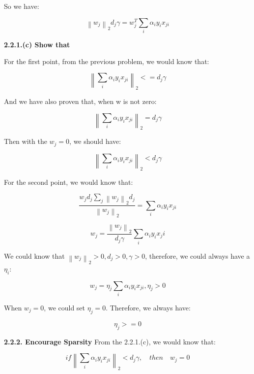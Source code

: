\documentclass{article} %
\newcommand{\norm}[1]{\left\lVert #1 \right\rVert}
\begin{document}
So we have:

\begin{equation}
\norm{w_j}_2 d_j \gamma = w_j^T \sum_i \alpha_i y_i x_{ji}
\end{equation}

\textbf{2.2.1.(c) Show that}

For the first point, from the previous problem, we would know that:

\begin{equation}
\norm{\sum_i \alpha_i y_i x_{ji}}_2 <= d_j \gamma
\end{equation}

And we have also proven that, when w is not zero:

\begin{equation}
\norm{\sum_i \alpha_i y_i x_{ji}}_2 = d_j \gamma
\end{equation}

Then with the $w_j = 0$, we should have:

\begin{equation}
\norm{\sum_i \alpha_i y_i x_{ji}}_2 < d_j \gamma
\end{equation}

For the second point, we would know that:

\begin{equation}
\frac{w_j d_j \sum_j \norm{w_j}_2 d_j }{\norm{w_j}_2} = \sum_i \alpha_i y_i x_{ji}
\end{equation}

\begin{equation}
w_j = \frac{\norm{w_j}_2}{d_j \gamma} \sum_i \alpha_i y_i x_ji
\end{equation}

We could know that $\norm{w_j}_2 > 0, d_j>0, \gamma>0$, therefore, we could
always have a $\eta_i$:

\begin{equation}
w_j = \eta_j \sum_i \alpha_i y_i x_{ji}, \eta_j > 0
\end{equation}

When $w_j = 0$, we could set $\eta_j = 0$. Therefore, we always have:

\begin{equation}
\eta_j >= 0
\end{equation}

\textbf{2.2.2. Encourage Sparsity}
From the 2.2.1.(c), we would know that:

\begin{equation}
if \norm{\sum_i \alpha_i y_i x_{ji}}_2 < d_j \gamma, \quad then \quad w_j = 0
\end{equation}
\end{document}

